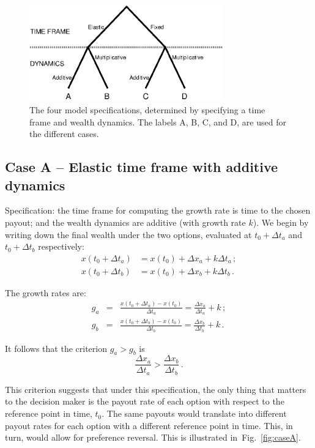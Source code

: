 \documentclass[11pt]{article}
\newcommand{\flabel}[1]{\label{fig:#1}}
\newcommand{\fref}[1]{Fig.~\ref{fig:#1}}
\newcommand{\be}{\begin{equation}}
\newcommand{\ee}{\end{equation}}
\newcommand{\bea}{\begin{eqnarray}}
\newcommand{\eea}{\end{eqnarray}}
\newcommand{\Dt}{\Delta t}
\newcommand{\Dx}{\Delta x}
\numberwithin{equation}{section}
\begin{document}
\begin{figure}[!htb]
\centering
\includegraphics[width=0.75\textwidth]{./figures/tree.eps}
\caption{The four model specifications, determined by specifying a time frame and wealth dynamics. The labels A, B, C, and D, are used for the different cases.}
\flabel{tree}
\end{figure}

\subsection{Case A -- Elastic time frame with additive dynamics}\label{sec:case_A}

Specification: the time frame for computing the growth rate is time to the chosen payout; and the wealth dynamics are additive (with growth rate $k$). We begin by writing down the final wealth under the two options, evaluated at $t_0+\Dt_a$ and $t_0+\Dt_b$ respectively:
\bea
x\left(t_0+\Dt_a\right) &= x\left(t_0\right) + \Dx_a + k \Dt_a\,;\\
x\left(t_0+\Dt_b\right) &= x\left(t_0\right) + \Dx_b + k \Dt_b\,.
\eea

The growth rates are:
\bea
g_a &=& \frac{x\left(t_0+\Dt_a\right) - x\left(t_0\right)}{\Dt_a} = \frac{\Dx_a}{\Dt_a} + k\,;\\
g_b &=& \frac{x\left(t_0+\Dt_b\right) - x\left(t_0\right)}{\Dt_b} = \frac{\Dx_b}{\Dt_b} + k\,.
\eea

It follows that the criterion $g_a > g_b$ is
\be
\frac{\Dx_a}{\Dt_a} > \frac{\Dx_b}{\Dt_b}\,.
\ee

This criterion suggests that under this specification, the only thing that matters to the decision maker is the payout rate of each option with respect to the reference point in time, $t_0$. The same payouts would translate into different payout rates for each option with a different reference point in time. This, in turn, would allow for preference reversal. This is illustrated in~\fref{caseA}.
\end{document}
